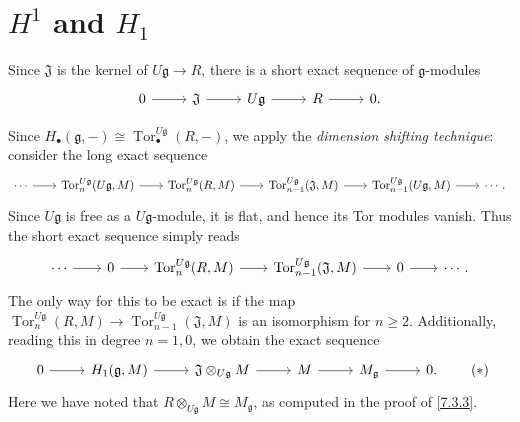 \section{$H^1$ and $H_1$}

Since $\mathfrak{J} $ is the kernel of $U\mathfrak{g} \to R$, there is a short exact sequence of $\mathfrak{g} $-modules
\[\begin{tikzcd}[row sep = 2.5em, column sep = 2.5em]
0\ar[r]  & \mathfrak{J} \ar[r]  & U\mathfrak{g} \ar[r]  & R\ar[r]  & 0.
\end{tikzcd}\]

Since $H_{\bullet} (\mathfrak{g} ,-)\cong \operatorname{Tor} _{\bullet} ^{U\mathfrak{g} } (R,-)$, we apply the \emph{dimension shifting technique}: consider the long exact sequence
\[\begin{tikzcd}[row sep = 2.5em, column sep = 2em]
\cdots \ar[r]  & \operatorname{Tor} _n^{U\mathfrak{g} } (U\mathfrak{g} ,M)\ar[r]  & \operatorname{Tor}_n^{U\mathfrak{g} } (R,M)\ar[r]  & \operatorname{Tor}_{n-1}^{U\mathfrak{g} } (\mathfrak{J} ,M)\ar[r]  & \operatorname{Tor} _{n-1} ^{U\mathfrak{g} } (U\mathfrak{g} ,M) \ar[r] & \cdots .
\end{tikzcd}\]
Since $U\mathfrak{g} $ is free as a $U\mathfrak{g} $-module, it is flat, and hence its Tor modules vanish. Thus the short exact sequence simply reads
\[\begin{tikzcd}[row sep = 2.5em, column sep = 2em]
\cdots \ar[r]  & 0\ar[r]  & \operatorname{Tor}_n^{U\mathfrak{g} } (R,M)\ar[r]  & \operatorname{Tor}_{n-1}^{U\mathfrak{g} } (\mathfrak{J} ,M)\ar[r]  & 0 \ar[r] & \cdots .
\end{tikzcd}\]
The only way for this to be exact is if the map $\operatorname{Tor} _n^{U\mathfrak{g} } (R,M)\to \operatorname{Tor} _{n-1} ^{U\mathfrak{g} } (\mathfrak{J} ,M)$ is an isomorphism for $n\geq 2$. Additionally, reading this in degree $n=1,0$, we obtain the exact sequence
\begin{equation}\begin{tikzcd}[row sep = 2.5em, column sep = 2.5em]
0\ar[r]  & H_1(\mathfrak{g} ,M)\ar[r]  & \mathfrak{J} \otimes _{U\mathfrak{g} } M\ar[r]  & M\ar[r]  & M_{\mathfrak{g} } \ar[r]  & 0.
\end{tikzcd}\tag{$*$}\label{eq:7.4.1}\end{equation}
Here we have noted that $R\otimes _{U\mathfrak{g} } M \cong M_\mathfrak{g} $, as computed in the proof of \cref{7.3.3}.


